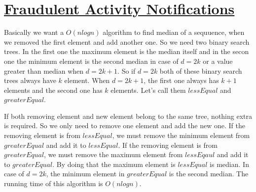 \documentclass{book}
\begin{document}
	\section{\href{https://www.hackerrank.com/challenges/fraudulent-activity-notifications/problem}{Fraudulent Activity Notifications}}
	Basically we want a $O(nlogn)$ algorithm to find median of a sequuence, when we removed the first element and add another one. So we need two binary search trees. In the first one the maximum element is the median itself and in the secon one the minimum element is the second median in case of $d = 2k$ or a value greater than median when $d = 2k + 1$. So if $d = 2k$ both of these binary search trees always have $k$ element. When $d = 2k + 1$, the first one always has $k + 1$ elements and the second one has $k$ elements. Let's call them $lessEqual$ and $greaterEqual$.
	\par If both removing element and new element belong to the same tree, nothing extra is required. So we only need to remove one element and add the new one. If the removing element is from $lessEqual$, we must remove the minimum element from $greaterEqual$ and add it to $lessEqual$. If the removing element is from $greaterEqual$, we must remove the maximum element from $lessEqaul$ and add it to $greaterEqual$. By doing that the maximum element is $lessEqual$ is median. In case of $d = 2k$, the minimum element in $greaterEqual$ is the second median. The running time of this algorithm is $O(nlogn)$.
\end{document}
